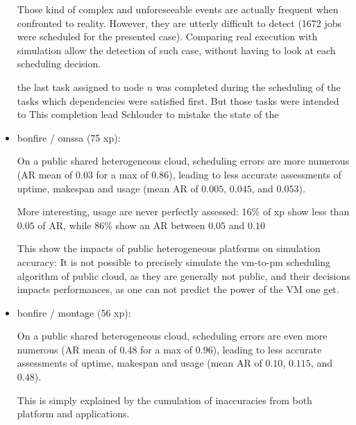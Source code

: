\begin{itemize}
      Those kind of complex and unforeseeable events are actually frequent 
      when confronted to reality. However, they are utterly difficult to detect
      (1672 jobs were scheduled for the presented case).
      Comparing real execution with simulation allow the detection of such case, 
      without having to look at each scheduling decision.
      
      the last task assigned to node $n$ was 
      completed during the scheduling of the tasks which dependencies were satisfied 
      first. But those tasks were intended to 
      This completion lead 
      Schlouder to mistake the state of the 
      
      
 
 \item bonfire / omssa (75 xp): 
 
      
      
      
      
      On a public shared heterogeneous cloud, scheduling errors are more numerous 
      (AR mean of $0.03$ for a max of $0.86$), leading to less accurate assessments
      of uptime, makespan and usage (mean AR of $0.005$, $0.045$, and $0.053$).

      More interesting, usage are never perfectly assessed: 
      16\% of xp show less than $0.05$ of AR, 
      while 86\% show an AR between $0.05$ and $0.10$
      
      This show the impacts of public heterogeneous platforms on simulation
      accuracy: 
      It is not possible to precisely simulate the vm-to-pm scheduling algorithm of 
      public cloud, as they are generally not public, and their decisions impacts 
      performances, as one can not predict the power of the VM one get.
 
 \item bonfire / montage (56 xp): 
 
      
      
      
 
      On a public shared heterogeneous cloud, scheduling errors are even more numerous 
      (AR mean of $0.48$ for a max of $0.96$), leading to less accurate assessments
      of uptime, makespan and usage (mean AR of $0.10$, $0.115$, and $0.48$).
      
      This is simply explained by the cumulation of inaccuracies from 
      both platform and applications. 
\end{itemize}




